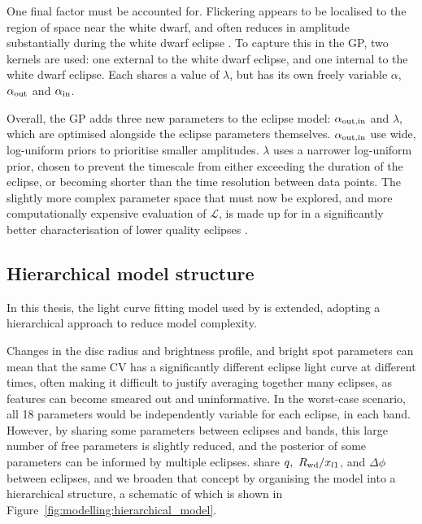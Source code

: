 One final factor must be accounted for. Flickering appears to be localised to the region of space near the white dwarf, and often reduces in amplitude substantially during the white dwarf eclipse \citep{mcallister2017}.
To capture this in the GP, two kernels are used: one external to the white dwarf eclipse, and one internal to the white dwarf eclipse. Each shares a value of $\lambda$, but has its own freely variable $\alpha$, $\alpha_{\rm out}$ and $\alpha_{\rm in}$.

Overall, the GP adds three new parameters to the eclipse model: $\alpha_{\rm out, in}$ and $\lambda$, which are optimised alongside the eclipse parameters themselves. $\alpha_{\rm out, in}$ use wide, log-uniform priors to prioritise smaller amplitudes. $\lambda$ uses a narrower log-uniform prior, chosen to prevent the timescale from either exceeding the duration of the eclipse, or becoming shorter than the time resolution between data points.
The slightly more complex parameter space that must now be explored, and more computationally expensive evaluation of $\mathcal{L}$, is made up for in a significantly better characterisation of lower quality eclipses \citep{mcallister2017}.



\subsection{Hierarchical model structure}
\label{sect:modelling:optimising eclipse model parameters}

In this thesis, the light curve fitting model used by \citet{McAllister2019} is extended, adopting a hierarchical approach to reduce model complexity.

Changes in the disc radius and brightness profile, and bright spot parameters can mean that the same CV has a significantly different eclipse light curve at different times, often making it difficult to justify averaging together many eclipses, as features can become smeared out and uninformative. In the worst-case scenario, all 18 parameters would be independently variable for each eclipse, in each band. However, by sharing some parameters between eclipses and bands, this large number of free parameters is slightly reduced, and the posterior of some parameters can be informed by multiple eclipses. \citet{mcallister2017} share $q,\ R_{\rm wd} / x_{l1}$, and $\Delta\phi$ between eclipses, and we broaden that concept by organising the model into a hierarchical structure, a schematic of which is shown in Figure~\ref{fig:modelling:hierarchical_model}.

